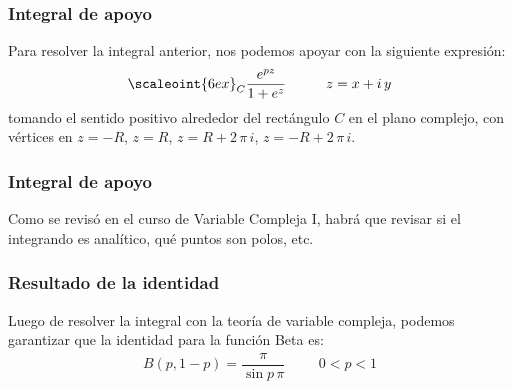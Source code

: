 \documentclass[12pt]{beamer}
\begin{document}
\begin{frame}
\frametitle{Integral de apoyo}
Para resolver la integral anterior, nos podemos apoyar con la siguiente expresión:
\pause
\begin{align*}
\scaleoint{6ex}_{C} \dfrac{e^{pz}}{1 + e^{z}} \hspace{1cm} z = x + i \, y
\end{align*}
\pause
tomando el sentido positivo alrededor del rectángulo $C$ en el plano complejo, con vértices en $z = -R$, $z = R$, $z = R + 2 \,  \pi \, i$, $z = -R +  2 \, \pi \, i$.
\end{frame}
\begin{frame}
\frametitle{Integral de apoyo}
Como se revisó en el curso de Variable Compleja I, habrá que revisar si el integrando es analítico, qué puntos son polos, etc.
\end{frame}
\begin{frame}
\frametitle{Resultado de la identidad}
Luego de resolver la integral con la teoría de variable compleja, podemos garantizar que la identidad para la función Beta es:
\pause
\begin{align*}
B(p, 1 - p) = \dfrac{\pi}{\sin p \, \pi} \hspace{1cm} 0 < p < 1
\end{align*}
\end{frame}
\end{document}
